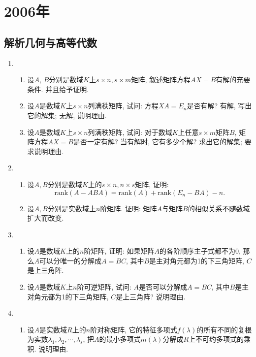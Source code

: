 \documentclass[12pt,a4paper,openany]{book}
\begin{document}
\section{2006年}
\subsection{解析几何与高等代数}
\begin{enumerate}
\item \begin{enumerate}
\item 设$A$, $B$分别是数域$K$上$s \times n, s \times m$矩阵, 叙述矩阵方程$AX = B$有解的充要条件. 并且给予证明.
\item 设$A$是数域$K$上$s \times n$列满秩矩阵, 试问: 方程$XA = E_n$是否有解? 有解, 写出它的解集; 无解, 说明理由.
\item 设$A$是数域$K$上$s \times n$列满秩矩阵, 试问: 对于数域$K$上任意$s \times m$矩阵$B$, 矩阵方程$AX = B$是否一定有解? 当有解时, 它有多少个解? 求出它的解集; 要求说明理由.
\end{enumerate}

\item \begin{enumerate}
\item 设$A, B$分别是数域$K$上的$s \times n, n \times s$矩阵, 证明:
\[
\text{rank}(A - ABA) = \text{rank}(A) + \text{rank}(E_n - BA) - n.
\]

\item 设$A, B$分别是实数域上$n$阶矩阵. 证明: 矩阵$A$与矩阵$B$的相似关系不随数域扩大而改变.
\end{enumerate}

\item \begin{enumerate}
\item 设$A$是数域$K$上的$n$阶矩阵, 证明: 如果矩阵$A$的各阶顺序主子式都不为0, 那么$A$可以分唯一的分解成$A = BC$, 其中$B$是主对角元都为1的下三角矩阵, $C$是上三角阵.

\item 设$A$是数域$K$上$n$阶可逆矩阵, 试问: $A$是否可以分解成$A = BC$, 其中$B$是主对角元都为1的下三角矩阵, $C$是上三角阵? 说明理由.
\end{enumerate}

\item \begin{enumerate}
\item 设$A$是实数域$R$上的$n$阶对称矩阵, 它的特征多项式$f(\lambda)$的所有不同的复根为实数$\lambda_1, \lambda_2, \cdots, \lambda_s$, 把$A$的最小多项式$m(\lambda)$分解成$R$上不可约多项式的乘积. 说明理由.


\end{enumerate}
\end{enumerate}
\end{document}
